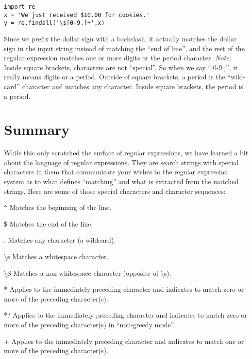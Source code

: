 \beforeverb
\begin{verbatim}
import re
x = 'We just received $10.00 for cookies.'
y = re.findall('\$[0-9.]+',x)
\end{verbatim}
\afterverb
%
Since we prefix the dollar sign with a backslash, it actually matches the dollar sign
in the input string instead of matching the ``end of line'', and the rest of the regular
expression matches one or more digits or the period character.  {\em Note:} Inside 
square brackets, characters are not ``special''.   So when we say ``[0-9.]'', it really 
means digits or a period.    Outside of square brackets, a period is the ``wild-card'' 
character and matches any character.  Inside square brackets, the period is a period.

\section{Summary}

While this only scratched the surface of regular expressions, we have learned a bit about
the language of regular expressions.  They are search strings with special characters in them
that communicate your wishes to the regular expression system as to what defines ``matching''
and what is extracted from the matched strings.  Here are some of those special characters
and character sequences:

\verb"^" \newline
Matches the beginning of the line.

\$ \newline
Matches the end of the line.

. \newline
Matches any character (a wildcard).

{\textbackslash}s \newline
Matches a whitespace character.

{\textbackslash}S \newline
Matches a non-whitespace character (opposite of {\textbackslash}s).

* \newline
Applies to the immediately preceding character and indicates to match zero or more of the
preceding character(s).

*? \newline
Applies to the immediately preceding character and indicates to match zero or more of the
preceding character(s) in ``non-greedy mode''.

+ \newline
Applies to the immediately preceding character and indicates to match one or more of the 
preceding character(s).

